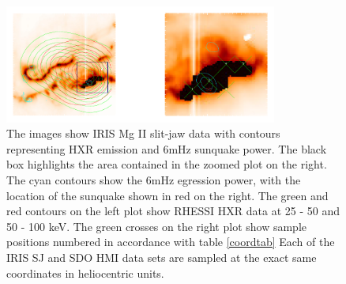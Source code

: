 \begin{figure}[H]
  \begin{center}
  \includegraphics[width=0.8\textwidth]{29-Mar-14-MGII-Sunquake-Context-Plots-xx-Zoom-crop}
  \end{center}
  \caption{The images show IRIS Mg II slit-jaw data with contours representing HXR emission and 6mHz sunquake power. The black box highlights the area contained in the zoomed plot on the right. The cyan contours show the 6mHz egression power, with the location of the sunquake shown in red on the right. The green and red contours on the left plot show RHESSI HXR data at 25 - 50 and 50 - 100 keV. The green crosses on the right plot show sample positions numbered in accordance with table \ref{coordtab} Each of the IRIS SJ and SDO HMI data sets are sampled at the exact same coordinates in heliocentric units.}\label{mgrib}
\end{figure}


